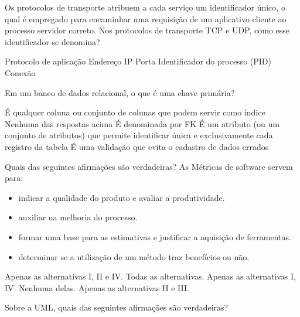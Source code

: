 \documentclass[12pt, addpoints]{exam}
\begin{document}
\begin{questions}
\question

Os protocolos de transporte atribuem a cada serviço um identificador único, o qual é empregado para encaminhar uma requisição de um aplicativo cliente ao processo servidor correto. Nos protocolos de transporte TCP e UDP, como esse identificador se denomina?
\begin{choices}
\choice Protocolo de aplicação
\choice Endereço IP
\choice Porta
\choice Identificador do processo (PID)
\choice Conexão
\end{choices}

\question

Em um banco de dados relacional, o que é uma chave primária?


\begin{choices}
\choice É qualquer coluna ou conjunto de colunas que podem servir como índice
\choice Nenhuma das respostas acima
\choice É denominada por FK
\choice É um atributo (ou um conjunto de atributos) que permite identificar única e exclusivamente cada registro da tabela
\choice É uma validação que evita o cadastro de dados errados
\end{choices}

\question

Quais das seguintes afirmações são verdadeiras? As Métricas de software servem para:



\begin{itemize}

    \item[I)] indicar a qualidade do produto e avaliar a produtividade.

    \item[II)] auxiliar na melhoria do processo.

    \item[III)] formar uma base para as estimativas e justificar a aquisição de ferramentas.

    \item[IV)] determinar se a utilização de um método traz benefícios ou não.

\end{itemize}
\begin{choices}
\choice Apenas as alternativas I, II e IV.
\choice Todas as alternativas.
\choice Apenas as alternativas I, IV.
\choice Nenhuma delas.
\choice Apenas as alternativas II e III.
\end{choices}

\question

Sobre a UML, quais das seguintes afirmações são verdadeiras?




\end{questions}
\end{document}
